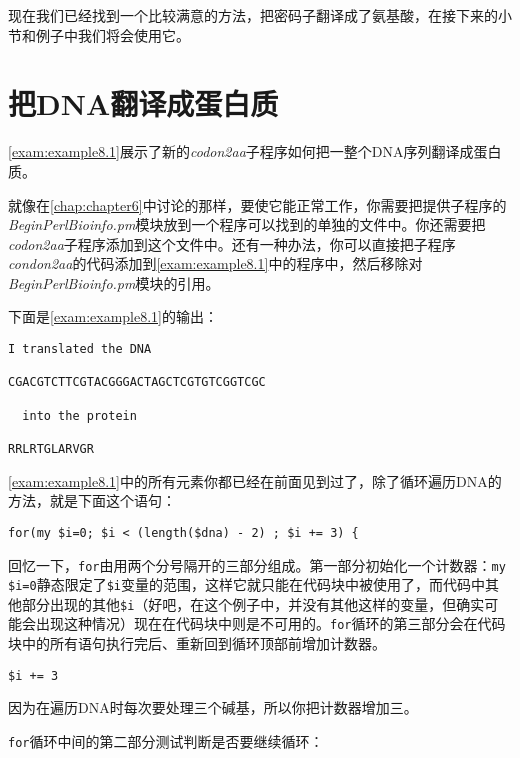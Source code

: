现在我们已经找到一个比较满意的方法，把密码子翻译成了氨基酸，在接下来的小节和例子中我们将会使用它。

\section{把DNA翻译成蛋白质}
\autoref{exam:example8.1}展示了新的\textit{codon2aa}子程序如何把一整个DNA序列翻译成蛋白质。



就像在\autoref{chap:chapter6}中讨论的那样，要使它能正常工作，你需要把提供子程序的\textit{BeginPerlBioinfo.pm}模块放到一个程序可以找到的单独的文件中。你还需要把\textit{codon2aa}子程序添加到这个文件中。还有一种办法，你可以直接把子程序\textit{condon2aa}的代码添加到\autoref{exam:example8.1}中的程序中，然后移除对\textit{BeginPerlBioinfo.pm}模块的引用。

下面是\autoref{exam:example8.1}的输出：

\begin{lstlisting}
I translated the DNA

CGACGTCTTCGTACGGGACTAGCTCGTGTCGGTCGC

  into the protein

RRLRTGLARVGR
\end{lstlisting}

\autoref{exam:example8.1}中的所有元素你都已经在前面见到过了，除了循环遍历DNA的方法，就是下面这个语句：

\begin{lstlisting}
for(my $i=0; $i < (length($dna) - 2) ; $i += 3) {
\end{lstlisting}

回忆一下，\verb|for|由用两个分号隔开的三部分组成。第一部分初始化一个计数器：\verb|my $i=0|静态限定了\verb|$i|变量的范围，这样它就只能在代码块中被使用了，而代码中其他部分出现的其他\verb|$i|（好吧，在这个例子中，并没有其他这样的变量，但确实可能会出现这种情况）现在在代码块中则是不可用的。\verb|for|循环的第三部分会在代码块中的所有语句执行完后、重新回到循环顶部前增加计数器。

\begin{lstlisting}
$i += 3
\end{lstlisting}

因为在遍历DNA时每次要处理三个碱基，所以你把计数器增加三。

\verb|for|循环中间的第二部分测试判断是否要继续循环：

